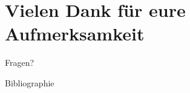 \documentclass[10pt]{beamer}
\begin{document}
\section{Vielen Dank für eure Aufmerksamkeit}

\appendix

	\begin{frame}[standout]
		Fragen?
	\end{frame}

	\begin{frame}[allowframebreaks]{Bibliographie}
		
		
	\end{frame}

\end{document}
